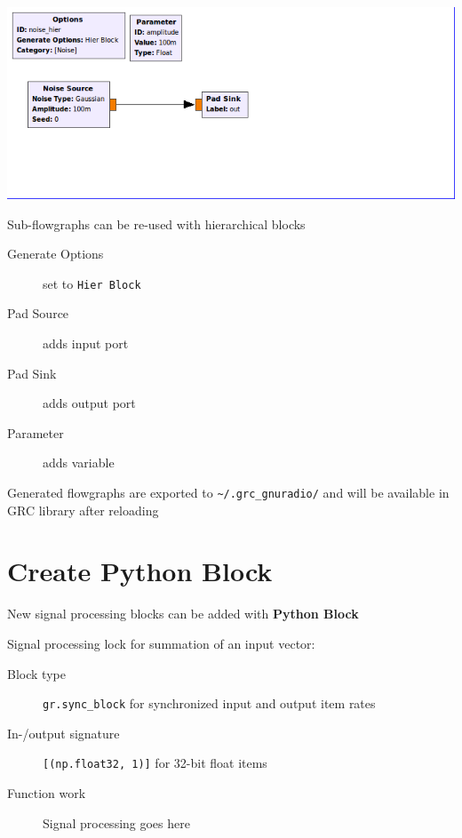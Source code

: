 \documentclass[10pt]{article}
\begin{document}
\begin{multicols*}{3}
\includegraphics[width=0.99\linewidth]{./noise-hier.png}

Sub-flowgraphs can be re-used with hierarchical blocks

\begin{description}
\item[Generate Options] set to \verb|Hier Block|
\item[Pad Source] adds input port
\item[Pad Sink] adds output port
\item[Parameter] adds variable
\end{description}

Generated flowgraphs are exported to \verb|~/.grc_gnuradio/| and will be available in GRC library after reloading


\section*{Create Python Block}

New signal processing blocks can be added with \textbf{Python Block}


Signal processing lock for summation of an input vector:
\begin{description}
\item[Block type] \verb|gr.sync_block| for synchronized input and output item rates

\item[In-/output signature] \verb|[(np.float32, 1)]| for 32-bit float items

\item[Function work] Signal processing goes here
\end{description}

%
%
%


\end{multicols*}
\end{document}
